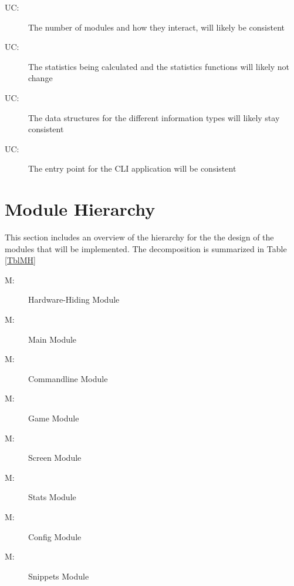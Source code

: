 \documentclass[12pt, titlepage]{article}
\newcounter{ucnum}
\newcommand{\uctheucnum}{UC\theucnum}
\newcounter{mnum}
\newcommand{\mthemnum}{M\themnum}
\begin{document}
\begin{description}
\item[ \uctheucnum \label{ucHardware}:] The number of modules and how they interact, will likely be consistent
\item[ \uctheucnum \label{ucSt}:] The statistics being calculated and the statistics functions will likely not change
\item [ \uctheucnum \label{ucD}:] The data structures for the different information types will likely stay consistent
\item [ \uctheucnum \label{ucEnt}:] The entry point for the CLI application will be consistent
\end{description}

\section{Module Hierarchy} \label{SecMH}

This section includes an overview of the hierarchy for the the design of the modules that will be implemented. The decomposition is summarized in Table \ref{TblMH}

\begin{description}
\item [ \mthemnum \label{mHH}:] Hardware-Hiding Module
\item [ \mthemnum \label{mMa}:] Main Module
\item [ \mthemnum \label{mCl}:] Commandline Module
\item [ \mthemnum \label{mGm}:] Game Module
\item [ \mthemnum \label{mSc}:] Screen Module
\item [ \mthemnum \label{mSt}:] Stats Module
\item [ \mthemnum \label{mCg}:] Config Module
\item [ \mthemnum \label{mD}:] Snippets Module
\end{description}
\end{document}
